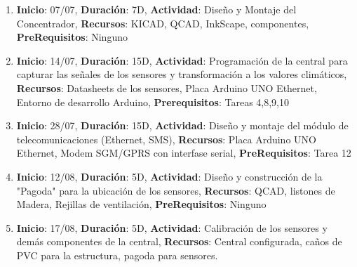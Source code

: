 \documentclass[a4paper,11pt, spanish]{article}
\begin{document}
\begin{enumerate}
\item \textbf{Inicio}: 07/07, \textbf{Duración}: 7D, \textbf{Actividad}: Diseño y Montaje del Concentrador, \textbf{Recursos}: KICAD, QCAD, InkScape, componentes, \textbf{PreRequisitos}: Ninguno 
\item \textbf{Inicio}: 14/07, \textbf{Duración}: 15D, \textbf{Actividad}: Programación de la central para capturar las señales de los sensores y transformación a los valores climáticos, \textbf{Recursos}: Datasheets de los sensores, Placa Arduino UNO Ethernet, Entorno de desarrollo Arduino, \textbf{Prerequisitos}: Tareas 4,8,9,10
\item \textbf{Inicio}: 28/07, \textbf{Duración}: 15D, \textbf{Actividad}: Diseño y montaje del módulo de telecomunicaciones (Ethernet, SMS), \textbf{Recursos}: Placa Arduino UNO Ethernet, Modem SGM/GPRS con interfase serial, \textbf{PreRequisitos}: Tarea 12
\item \textbf{Inicio}: 12/08, \textbf{Duración}: 5D, \textbf{Actividad}: Diseño y construcción de la "Pagoda" para la ubicación de los sensores, \textbf{Recursos}: QCAD, listones de Madera, Rejillas de ventilación, \textbf{PreRequisitos}: Ninguno
\item \textbf{Inicio}: 17/08, \textbf{Duración}: 5D, \textbf{Actividad}: Calibración de los sensores y demás componentes de la central, \textbf{Recursos}: Central configurada, caños de PVC para la estructura, pagoda para sensores.

\end{enumerate}
\end{document}
